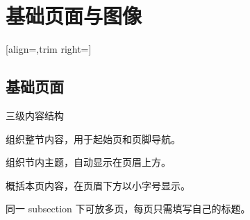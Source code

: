 \section{基础页面与图像}
[align=\campusexamplesectionalign,trim right=\campusexamplesectiontrim]
\subsection{基础页面}





\begin{frame}{三级内容结构}
      \begin{description}[Subsection]
            \item[Section] 组织整节内容，用于起始页和页脚导航。
            \item[Subsection] 组织节内主题，自动显示在页眉上方。
            \item[Frametitle] 概括本页内容，在页眉下方以小字号显示。
            \item[连续页面] 同一 subsection 下可放多页，每页只需填写自己的标题。
      \end{description}
\end{frame}





